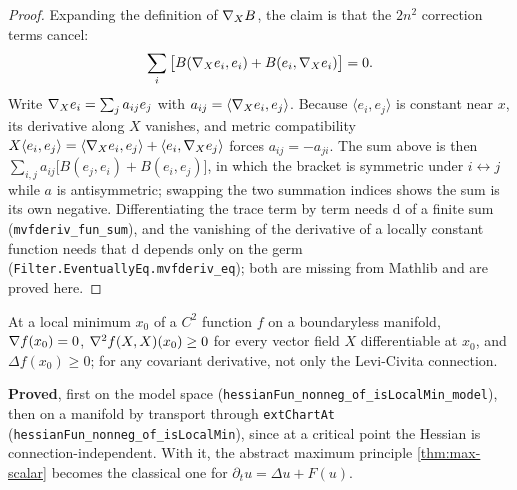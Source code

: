 \begin{proof}
  \leanok
  Expanding the definition of $\nabla_X B$, the claim is that the $2n^2$
  correction terms cancel:
  \[
    \sum_i \big[ B(\nabla_X e_i, e_i) + B(e_i, \nabla_X e_i) \big] = 0 .
  \]
  Write $\nabla_X e_i = \sum_j a_{ij} e_j$ with $a_{ij} = \langle \nabla_X e_i,
  e_j \rangle$. Because $\langle e_i, e_j \rangle$ is constant near $x$, its
  derivative along $X$ vanishes, and metric compatibility
  $X\langle e_i, e_j\rangle = \langle \nabla_X e_i, e_j\rangle + \langle e_i,
  \nabla_X e_j\rangle$ forces $a_{ij} = -a_{ji}$. The sum above is then
  $\sum_{i,j} a_{ij}\big[B(e_j,e_i) + B(e_i,e_j)\big]$, in which the bracket is
  symmetric under $i \leftrightarrow j$ while $a$ is antisymmetric; swapping
  the two summation indices shows the sum is its own negative. Differentiating
  the trace term by term needs $\mathrm{d}$ of a finite sum
  (\texttt{mvfderiv\_fun\_sum}), and the vanishing of the derivative of a
  locally constant function needs that $\mathrm{d}$ depends only on the germ
  (\texttt{Filter.EventuallyEq.mvfderiv\_eq}); both are missing from Mathlib
  and are proved here.
\end{proof}

\begin{lemma}
  \label{lem:second-derivative-test}
  \leanok
  At a local minimum $x_0$ of a $C^2$ function $f$ on a boundaryless
  manifold, $\nabla f(x_0) = 0$, $\nabla^2 f(X,X)(x_0) \ge 0$ for every vector
  field $X$ differentiable at $x_0$, and $\Delta f(x_0) \ge 0$; for any
  covariant derivative, not only the Levi-Civita connection.

  \textbf{Proved}, first on the model space
  (\texttt{hessianFun\_nonneg\_of\_isLocalMin\_model}), then on a manifold by
  transport through \texttt{extChartAt}
  (\texttt{hessianFun\_nonneg\_of\_isLocalMin}), since at a critical point
  the Hessian is connection-independent. With it, the abstract maximum
  principle \ref{thm:max-scalar} becomes the classical one for
  $\partial_t u = \Delta u + F(u)$.
\end{lemma}

